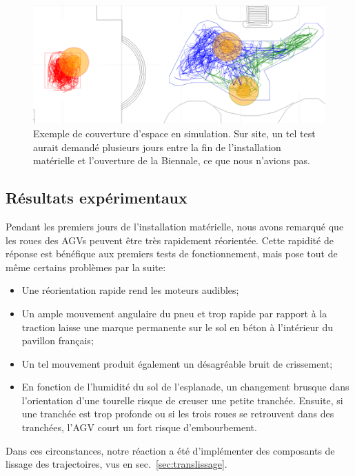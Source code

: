\documentclass[french,A4paper,]{book}
\providecommand{\tightlist}{%
  \setlength{\itemsep}{0pt}\setlength{\parskip}{0pt}}
\begin{document}
\begin{figure}
\centering
\includegraphics[width=1.00000\textwidth]{imgs/covering.png}
\caption{Exemple de couverture d'espace en simulation. Sur site, un tel
test aurait demandé plusieurs jours entre la fin de l'installation
matérielle et l'ouverture de la Biennale, ce que nous n'avions
pas.}\label{fig:ressimulation}
\end{figure}

\subsection{Résultats
expérimentaux}\label{ruxe9sultats-expuxe9rimentaux}

Pendant les premiers jours de l'installation matérielle, nous avons
remarqué que les roues des AGVs peuvent être très rapidement réorientée.
Cette rapidité de réponse est bénéfique aux premiers tests de
fonctionnement, mais pose tout de même certains problèmes par la suite:

\begin{itemize}
\tightlist
\item
  Une réorientation rapide rend les moteurs audibles;
\item
  Un ample mouvement angulaire du pneu et trop rapide par rapport à la
  traction laisse une marque permanente sur le sol en béton à
  l'intérieur du pavillon français;
\item
  Un tel mouvement produit également un désagréable bruit de crissement;
\item
  En fonction de l'humidité du sol de l'esplanade, un changement brusque
  dans l'orientation d'une tourelle risque de creuser une petite
  tranchée. Ensuite, si une tranchée est trop profonde ou si les trois
  roues se retrouvent dans des tranchées, l'AGV court un fort risque
  d'embourbement.
\end{itemize}

Dans ces circonstances, notre réaction a été d'implémenter des
composants de lissage des trajectoires, vus en
sec.~\ref{sec:translissage}.
\end{document}
